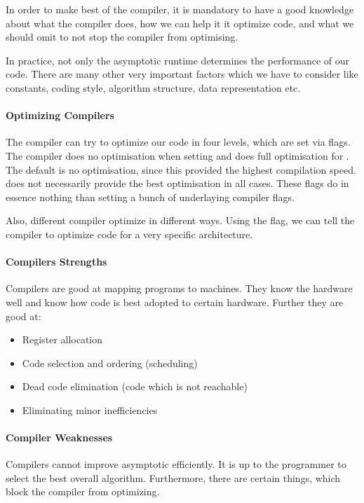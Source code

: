 

In order to make best of the compiler, it is mandatory to have a good knowledge about what the compiler does, how we can help it it optimize code, and what we should omit to not stop the compiler from optimising.

In practice, not only the asymptotic runtime determines the performance of our code. There are many other very important factors which we have to consider like constants, coding style, algorithm structure, data representation etc.

\paragraph{Optimizing Compilers}
The compiler can try to optimize our code in four levels, which are set via flags. The compiler does no optimisation when setting  and does full optimisation for . The default is no optimisation, since this provided the highest compilation speed.  does not necessarily provide the best optimisation in all cases. These flags do in essence nothing than setting a bunch of underlaying compiler flags.

Also, different compiler optimize in different ways. Using the  flag, we can tell the compiler to optimize code for a very specific architecture.

\paragraph{Compilers Strengths}
Compilers are good at mapping programs to machines. They know the hardware well and know how code is best adopted to certain hardware. Further they are good at:
\begin{itemize}
    \item Register allocation
    \item Code selection and ordering (scheduling)
    \item Dead code elimination (code which is not reachable)
    \item Eliminating minor inefficiencies
\end{itemize}

\paragraph{Compiler Weaknesses}
Compilers cannot improve asymptotic efficiently. It is up to the programmer to select the best overall algorithm. Furthermore, there are certain things, which block the compiler from optimizing.

